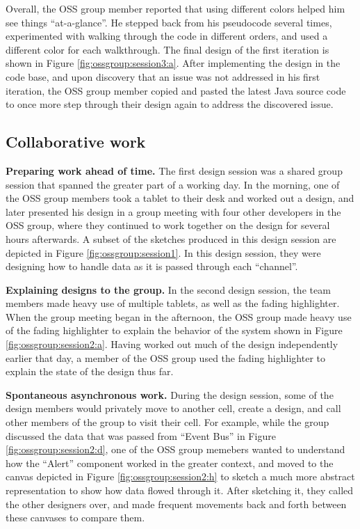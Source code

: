 Overall, the OSS group member reported that using different colors helped him see things ``at-a-glance''. He stepped back from his pseudocode several times, experimented with walking through the code in different orders, and used a different color for each walkthrough. The final design of the first iteration is shown in Figure \ref{fig:ossgroup:session3:a}. After implementing the design in the code base, and upon discovery that an issue was not addressed in his first iteration, the OSS group member copied and pasted the latest Java source code to once more step through their design again to address the discovered issue.

\subsection{Collaborative work}

\textbf{Preparing work ahead of time.} The first design session was a shared group session that spanned the greater part of a working day. In the morning, one of the OSS group members took a tablet to their desk and worked out a design, and later presented his design in a group meeting with four other developers in the OSS group, where they continued to work together on the design for several hours afterwards. A subset of the sketches produced in this design session are depicted in Figure \ref{fig:ossgroup:session1}. In this design session, they were designing how to handle data as it is passed through each ``channel''.

\textbf{Explaining designs to the group.} In the second design session, the team members made heavy use of multiple tablets, as well as the fading highlighter. When the group meeting began in the afternoon, the OSS group made heavy use of the fading highlighter to explain the behavior of the system shown in Figure \ref{fig:ossgroup:session2:a}. Having worked out much of the design independently earlier that day, a member of the OSS group used the fading highlighter to explain the state of the design thus far. 

\textbf{Spontaneous asynchronous work.} During the design session, some of the design members would privately move to another cell, create a design, and call other members of the group to visit their cell. For example, while the group discussed the data that was passed from ``Event Bus'' in Figure \ref{fig:ossgroup:session2:d}, one of the OSS group memebers wanted to understand how the ``Alert'' component worked in the greater context, and moved to the canvas depicted in Figure \ref{fig:ossgroup:session2:h} to sketch a much more abstract representation to show how data flowed through it. After sketching it, they called the other designers over, and made frequent movements back and forth between these canvases to compare them.

